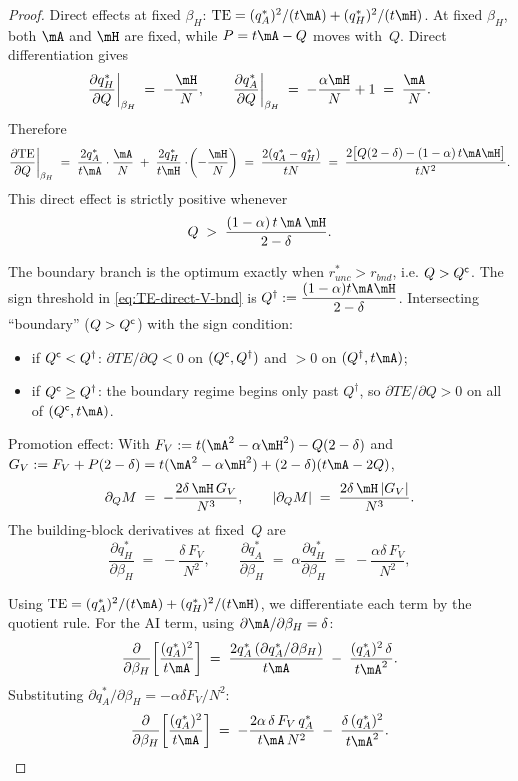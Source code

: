 \begin{proof}
Direct effects at fixed $\beta_H$:
$\text{TE} = (q_A^*)^2/(t\mA) + (q_H^*)^2/(t\mH)$. At fixed $\beta_H$, both $\mA$ and $\mH$ are fixed, while $P = t\mA - Q$ moves with~$Q$. Direct differentiation gives
\[
\frac{\partial q_H^*}{\partial Q}\bigg|_{\beta_H} \;=\; -\frac{\mH}{N},
\qquad
\frac{\partial q_A^*}{\partial Q}\bigg|_{\beta_H} \;=\; -\frac{\alpha\mH}{N} + 1 \;=\; \frac{\mA}{N}.
\]
Therefore
\[
\frac{\partial \text{TE}}{\partial Q}\bigg|_{\beta_H}
\;=\; \frac{2 q_A^*}{t\mA}\cdot\frac{\mA}{N}
\;+\; \frac{2 q_H^*}{t\mH}\cdot\!\left(-\frac{\mH}{N}\right)
\;=\; \frac{2(q_A^* - q_H^*)}{tN}
\;=\; \frac{2\bigl[Q(2-\delta) - (1-\alpha)\,t\mA\mH\bigr]}{tN^2}.
\]
This direct effect is strictly positive whenever
\begin{equation}\label{eq:TE-direct-V-bnd}
Q \;>\; \frac{(1-\alpha)\,t\,\mA\,\mH}{\,2-\delta\,}.
\end{equation}

The boundary branch is the optimum exactly when
$r_{unc}^*>r_{bnd}$, i.e. $Q>Q^{\sf c}$. The sign threshold in
\eqref{eq:TE-direct-V-bnd} is $Q^{\dagger}:=\dfrac{(1-\alpha)t\mA\mH}{2-\delta}$.
Intersecting ``boundary'' ($Q>Q^{\sf c}$) with the sign condition:
\begin{itemize}
  \item if $Q^{\sf c}<Q^{\dagger}$: $\partial TE/\partial Q<0$ on $(Q^{\sf c},Q^{\dagger})$
        and $>0$ on $(Q^{\dagger},t\mA)$;
  \item if $Q^{\sf c}\ge Q^{\dagger}$: the boundary regime begins only past $Q^\dagger$,
        so $\partial TE/\partial Q>0$ on all of $(Q^{\sf c},t\mA)$.
\end{itemize}


Promotion effect:
With $F_V := t(\mA^2 - \alpha\mH^2) - Q(2-\delta)$ and $G_V := F_V + P(2-\delta) = t(\mA^2-\alpha\mH^2) + (2-\delta)(t\mA - 2Q)$,
\[
\partial_Q M
\;=\; -\frac{2\delta\,\mH\,G_V}{N^3},
\qquad
\left|\partial_Q M\right|
\;=\; \frac{2\delta\,\mH\,|G_V|}{N^3}.
\]
The building-block derivatives at fixed~$Q$ are
\[
\frac{\partial q_H^*}{\partial\beta_H}
\;=\; -\frac{\delta\,F_V}{N^2},
\qquad
\frac{\partial q_A^*}{\partial\beta_H}
\;=\; \alpha\frac{\partial q_H^*}{\partial\beta_H}
\;=\; -\frac{\alpha\delta\,F_V}{N^2},
\]

Using $\text{TE} = (q_A^*)^2/(t\mA) + (q_H^*)^2/(t\mH)$, we differentiate each term by the quotient rule. For the AI term, using $\partial\mA/\partial\beta_H = \delta$:
\[
\frac{\partial}{\partial\beta_H}\!\left[\frac{(q_A^*)^2}{t\mA}\right]
\;=\; \frac{2 q_A^*\,(\partial q_A^*/\partial\beta_H)}{t\mA}
\;-\; \frac{(q_A^*)^2\,\delta}{t\mA^2}.
\]
Substituting $\partial q_A^*/\partial\beta_H = -\alpha\delta F_V/N^2$:
\begin{equation}\label{eq:dTEA-dbeta-V-bnd}
\frac{\partial}{\partial\beta_H}\!\left[\frac{(q_A^*)^2}{t\mA}\right]
\;=\; -\frac{2\alpha\,\delta\,F_V\,q_A^*}{t\mA\,N^2}
\;-\; \frac{\delta\,(q_A^*)^2}{t\mA^2}.
\end{equation}


\end{proof}
